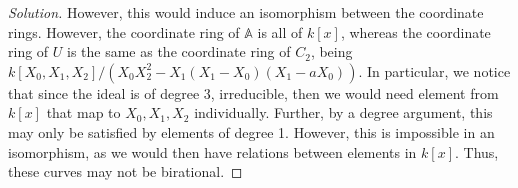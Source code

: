 \documentclass[10pt]{article}
\begin{document}
\begin{proof}[Solution]
However, this would induce an isomorphism between the coordinate rings. However, the coordinate ring of $\mathbb{A}$ is all of $k[x]$, whereas the coordinate ring of $U$ is the same as the coordinate ring of $C_2$, being $k[X_0,X_1, X_2]/(X_0X_2^2 - X_1(X_1 - X_0)(X_1 - aX_0))$. In particular, we notice that since the ideal is of degree 3, irreducible, then we would need element from $k[x]$ that map to $X_0,X_1,X_2$ individually. Further, by a degree argument, this may only be satisfied by elements of degree 1. However, this is impossible in an isomorphism, as we would then have relations between elements in $k[x]$. Thus, these curves may not be birational.

\end{proof}
\end{document}
